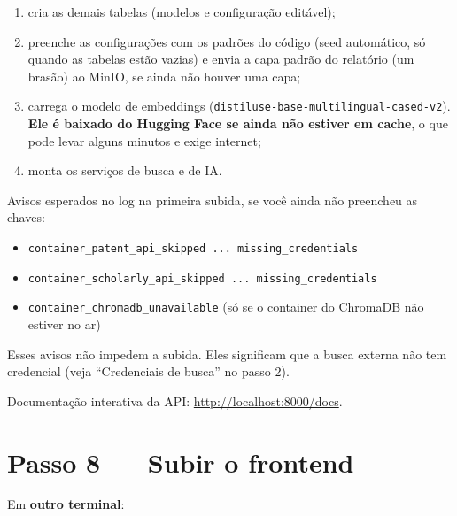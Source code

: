 \documentclass[
  brazilian,
  a4paper,12pt,oneside]{report}
\providecommand{\tightlist}{%
  \setlength{\itemsep}{0pt}\setlength{\parskip}{0pt}}
\begin{document}
\begin{enumerate}
\def\labelenumi{\arabic{enumi}.}
\tightlist
\item
  cria as demais tabelas (modelos e configuração editável);
\item
  preenche as configurações com os padrões do código (seed automático,
  só quando as tabelas estão vazias) e envia a capa padrão do relatório
  (um brasão) ao MinIO, se ainda não houver uma capa;
\item
  carrega o modelo de embeddings
  (\texttt{distiluse-}\allowbreak{}\texttt{base-}\allowbreak{}\texttt{multilingual-}\allowbreak{}\texttt{cased-}\allowbreak{}\texttt{v2}).
  \textbf{Ele é baixado do Hugging Face se ainda não estiver em cache},
  o que pode levar alguns minutos e exige internet;
\item
  monta os serviços de busca e de IA.
\end{enumerate}

Avisos esperados no log na primeira subida, se você ainda não preencheu
as chaves:

\begin{itemize}
\tightlist
\item
  \texttt{container\_}\allowbreak{}\texttt{patent\_}\allowbreak{}\texttt{api\_}\allowbreak{}\texttt{skipped\ .}\allowbreak{}\texttt{.}\allowbreak{}\texttt{.}\allowbreak{}\texttt{\ missing\_}\allowbreak{}\texttt{credentials}
\item
  \texttt{container\_}\allowbreak{}\texttt{scholarly\_}\allowbreak{}\texttt{api\_}\allowbreak{}\texttt{skipped\ .}\allowbreak{}\texttt{.}\allowbreak{}\texttt{.}\allowbreak{}\texttt{\ missing\_}\allowbreak{}\texttt{credentials}
\item
  \texttt{container\_}\allowbreak{}\texttt{chromadb\_}\allowbreak{}\texttt{unavailable}
  (só se o container do ChromaDB não estiver no ar)
\end{itemize}

Esses avisos não impedem a subida. Eles significam que a busca externa
não tem credencial (veja ``Credenciais de busca'' no passo 2).

Documentação interativa da API: \url{http://localhost:8000/docs}.

\section{Passo 8 --- Subir o frontend}\label{passo-8-subir-o-frontend}

Em \textbf{outro terminal}:
\end{document}
